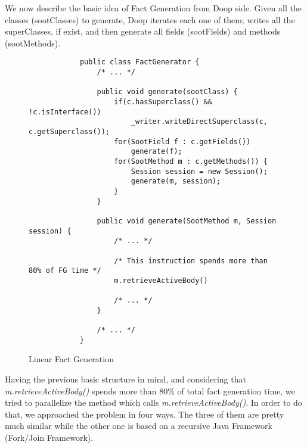 \documentclass{dithesis}
\begin{document}
    We now describe the basic idea of Fact Generation from Doop side. Given all the classes (sootClasses) to generate, Doop iterates each one of them; writes all the superClasses, if exist, and then generate all fields (sootFields) and methods (sootMethods). 
    \begin{figure}[H]
        \begin{lstlisting}
            public class FactGenerator {
                /* ... */

                public void generate(sootClass) {
                    if(c.hasSuperclass() && !c.isInterface())
                        _writer.writeDirectSuperclass(c, c.getSuperclass());
                    for(SootField f : c.getFields())
                        generate(f);
                    for(SootMethod m : c.getMethods()) {
                        Session session = new Session();
                        generate(m, session);
                    }
                }

                public void generate(SootMethod m, Session session) {
                    /* ... */
                    
                    /* This instruction spends more than 80% of FG time */
                    m.retrieveActiveBody() 
                    
                    /* ... */
                }

                /* ... */
            }
        \end{lstlisting}
    \caption{Linear Fact Generation}
    \end{figure}
    Having the previous basic structure in mind, and considering that \textit{m.retrieveActiveBody()} spends more than 80\% of total fact generation time, we tried to parallelize the method which calls \textit{m.retrieveActiveBody()}. In order to do that, we approached the problem in four ways. The three of them are pretty much similar while the other one is based on a recursive Java Framework (Fork/Join Framework). 
\end{document}
